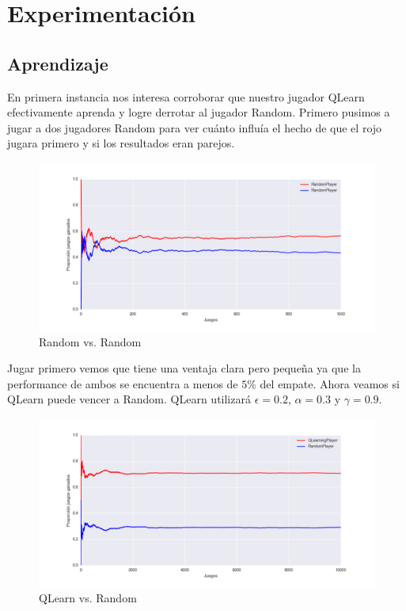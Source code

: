 \documentclass{article}
\begin{document}
\section{Experimentación}

\subsection{Aprendizaje}

En primera instancia nos interesa corroborar que nuestro jugador QLearn
efectivamente aprenda y logre derrotar al jugador Random. Primero pusimos a
jugar a dos jugadores Random para ver cuánto influía el hecho de que el rojo
jugara primero y si los resultados eran parejos.

\begin{figure}[H]
	\centerline{\includegraphics[width=1.3\textwidth]{figures/random_vs_random.png}}
	\caption{Random vs. Random}
\end{figure}

Jugar primero vemos que tiene una ventaja clara pero pequeña ya que la
performance de ambos se encuentra a menos de $5\%$ del empate. Ahora veamos si
QLearn puede vencer a Random. QLearn utilizará $\epsilon = 0.2$, $\alpha = 0.3$ y $\gamma = 0.9$.

\begin{figure}[H]
	\centerline{\includegraphics[width=1.3\textwidth]{figures/qlearn_vs_random.png}}
	\caption{QLearn vs. Random}
\end{figure}
\end{document}
